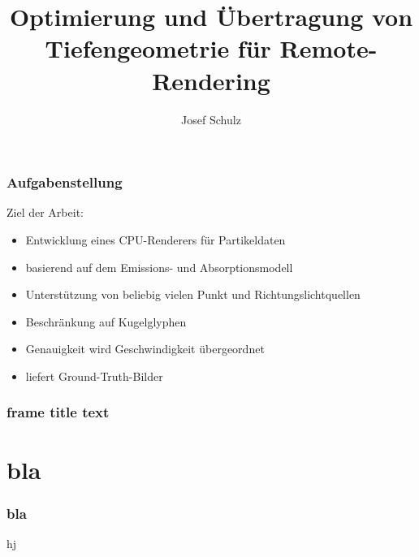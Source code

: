 \documentclass[xcolor=dvipsnames]{beamer}
\title{Optimierung und Übertragung von Tiefengeometrie für Remote-Rendering}
\author{Josef Schulz}
\institute{Technische Universität Dresden}
\begin{document}
\begin{frame}
	\maketitle
	\nocite*{}
	\thispagestyle{empty}
\end{frame}

\begin{frame}
	\frametitle{Aufgabenstellung}
	
	Ziel der Arbeit:	
	
	\vspace*{0.4cm}
	
	\begin{itemize}
		\setlength{\itemsep}{8pt}
		
		\item Entwicklung eines CPU-Renderers für Partikeldaten
		\item basierend auf dem Emissions- und Absorptionsmodell
		\item Unterstützung von beliebig vielen Punkt und Richtungslichtquellen
		\item Beschränkung auf Kugelglyphen
	\end{itemize}
	
	\vspace*{0.2cm}
	
	\begin{itemize}
		\item Genauigkeit wird Geschwindigkeit übergeordnet
		\item liefert Ground-Truth-Bilder
	\end{itemize}
\end{frame}

\begin{frame}
	\frametitle{frame title text}
	\tableofcontents
\end{frame}

\section{bla}
\begin{frame}
\frametitle{bla}
hj
\end{frame}

{\tiny}
\end{document}
